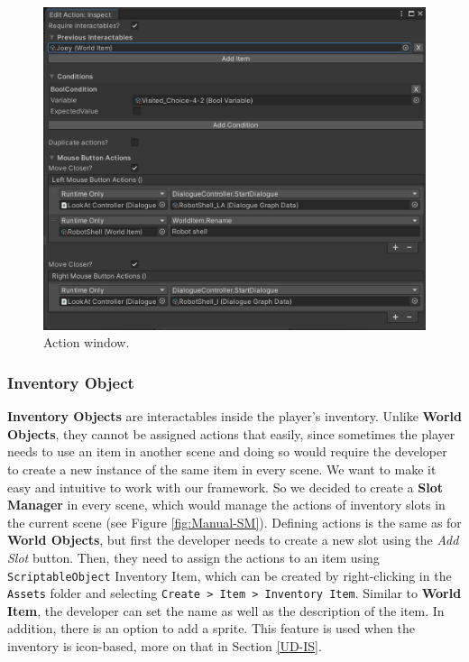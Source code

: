 \begin{figure}[H]
\centering
\includegraphics[width=.8\linewidth]{img/User doc/action_window.png}
\caption{Action window.}
\label{fig:BaSS-manual}
\end{figure}

\subsubsection{Inventory Object}
\label{Manual:IO}
\textbf{Inventory Objects} are interactables inside the player's inventory. Unlike \textbf{World Objects}, they cannot be assigned actions that easily, since sometimes the player needs to use an item in another scene and doing so would require the developer to create a new instance of the same item in every scene. We want to make it easy and intuitive to work with our framework. So we decided to create a \textbf{Slot Manager} in every scene, which would manage the actions of inventory slots in the current scene (see Figure \ref{fig:Manual-SM}). Defining actions is the same as for \textbf{World Objects}, but first the developer needs to create a new slot using the \textit{Add Slot} button. Then, they need to assign the actions to an item using \verb|ScriptableObject| Inventory Item, which can be created by right-clicking in the \verb|Assets| folder and selecting \verb|Create > Item > Inventory Item|. Similar to \textbf{World Item}, the developer can set the name as well as the description of the item. In addition, there is an option to add a sprite. This feature is used when the inventory is icon-based, more on that in Section \ref{UD-IS}.

